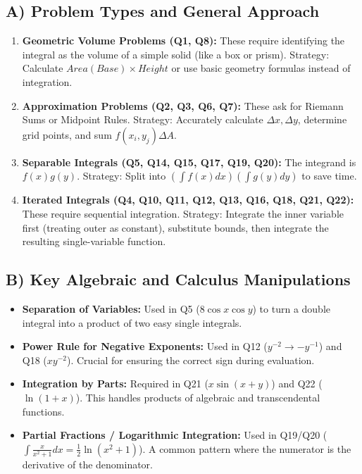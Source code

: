 \documentclass[11pt,a4paper]{article}
\begin{document}
\subsection{A) Problem Types and General Approach}
\begin{enumerate}
    \item \textbf{Geometric Volume Problems (Q1, Q8):} These require identifying the integral as the volume of a simple solid (like a box or prism). Strategy: Calculate $Area(Base) \times Height$ or use basic geometry formulas instead of integration.
    \item \textbf{Approximation Problems (Q2, Q3, Q6, Q7):} These ask for Riemann Sums or Midpoint Rules. Strategy: Accurately calculate $\Delta x, \Delta y$, determine grid points, and sum $f(x_i, y_j) \Delta A$.
    \item \textbf{Separable Integrals (Q5, Q14, Q15, Q17, Q19, Q20):} The integrand is $f(x)g(y)$. Strategy: Split into $(\int f(x)dx)(\int g(y)dy)$ to save time.
    \item \textbf{Iterated Integrals (Q4, Q10, Q11, Q12, Q13, Q16, Q18, Q21, Q22):} These require sequential integration. Strategy: Integrate the inner variable first (treating outer as constant), substitute bounds, then integrate the resulting single-variable function.
\end{enumerate}

\subsection{B) Key Algebraic and Calculus Manipulations}
\begin{itemize}
    \item \textbf{Separation of Variables:} Used in Q5 ($8 \cos x \cos y$) to turn a double integral into a product of two easy single integrals.
    \item \textbf{Power Rule for Negative Exponents:} Used in Q12 ($y^{-2} \to -y^{-1}$) and Q18 ($xy^{-2}$). Crucial for ensuring the correct sign during evaluation.
    \item \textbf{Integration by Parts:} Required in Q21 ($x \sin(x+y)$) and Q22 ($\ln(1+x)$). This handles products of algebraic and transcendental functions.
    \item \textbf{Partial Fractions / Logarithmic Integration:} Used in Q19/Q20 ($ \int \frac{x}{x^2+1} dx = \frac{1}{2}\ln(x^2+1) $). A common pattern where the numerator is the derivative of the denominator.
\end{itemize}
\end{document}
